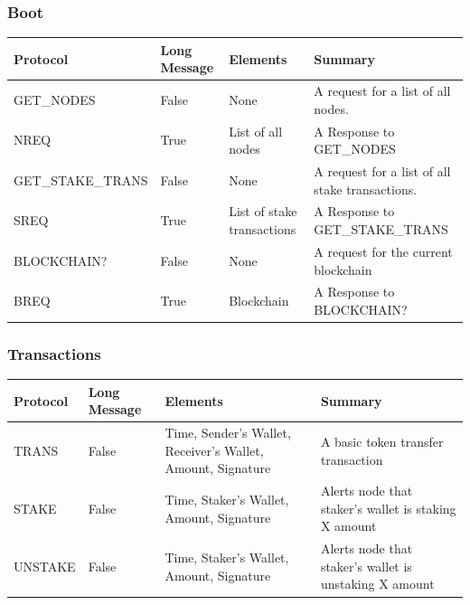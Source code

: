 \documentclass[11pt]{article}
\begin{document}
\subsubsection*{Boot}
\begin{center}
%
\begin{tabularx}{\textwidth}{| l | l | R | R |} 
\hline
Protocol & Long Message & Elements & Summary \\ \hline
GET\_NODES & False &  None & A request for a list of all nodes. \\ \hline
NREQ & True & List of all nodes & A Response to GET\_NODES \\ \hline
GET\_STAKE\_TRANS & False & None & A request for a list of all stake transactions. \\ \hline
SREQ & True & List of stake transactions & A Response to GET\_STAKE\_TRANS \\ \hline
BLOCKCHAIN? & False & None & A request for the current blockchain \\ \hline
BREQ & True & Blockchain &  A Response to BLOCKCHAIN? \\ \hline
\end{tabularx}
\end{center}

\subsubsection*{Transactions}
\begin{center}
%
\begin{tabularx}{\textwidth}{| l | l | R | R |} 
\hline
Protocol & Long Message & Elements & Summary \\ \hline
TRANS & False & Time, Sender's Wallet, Receiver's Wallet, Amount, Signature & A basic token transfer transaction \\ \hline
STAKE & False & Time, Staker's Wallet, Amount,  Signature & Alerts node that staker's wallet is staking X amount\\ \hline
UNSTAKE & False & Time, Staker's Wallet, Amount,  Signature & Alerts node that staker's wallet is unstaking X amount\\ \hline
\end{tabularx}
\end{center}
\end{document}
